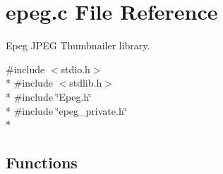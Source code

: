 \section{epeg.\-c File Reference}
\label{epeg_8c}


Epeg J\-P\-E\-G Thumbnailer library.  


{\ttfamily \#include $<$stdio.\-h$>$}\\*
{\ttfamily \#include $<$stdlib.\-h$>$}\\*
{\ttfamily \#include \char`\"{}Epeg.\-h\char`\"{}}\\*
{\ttfamily \#include \char`\"{}epeg\-\_\-private.\-h\char`\"{}}\\*
\subsection*{Functions}
